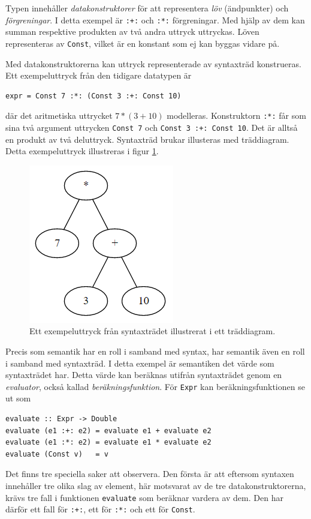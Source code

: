 Typen innehåller \textit{datakonstruktorer} för att representera
\textit{löv} (ändpunkter) och \textit{förgreningar}. I detta exempel är
\texttt{:+:} och \texttt{:*:} förgreningar. Med hjälp av dem kan summan respektive produkten av två andra uttryck uttryckas. Löven
representeras av
\texttt{Const}, vilket är en konstant som ej kan byggas vidare på.

Med datakonstruktorerna kan uttryck representerade av syntaxträd konstrueras. Ett exempeluttryck
från den tidigare datatypen är
\begin{lstlisting}
expr = Const 7 :*: (Const 3 :+: Const 10)
\end{lstlisting}
där det aritmetiska uttrycket $7 * (3
+ 10)$ modelleras. Konstruktorn \texttt{:*:} får som sina två argument uttrycken
\texttt{Const 7} och \texttt{Const 3 :+: Const 10}. Det är alltså en produkt av
två deluttryck. Syntaxträd brukar illusteras med träddiagram. Detta
exempeluttryck illustreras i figur \ref{fig:syntax_exempel_bild}.

\begin{figure}[tph]
  \centering
  \includegraphics[width=0.4\linewidth]{figure/syntax_exempel_bild.png}
  \caption{Ett exempeluttryck från syntaxträdet illustrerat i ett
           träddiagram.}\label{fig:syntax_exempel_bild}
\end{figure}

Precis som semantik har en roll i samband med syntax, har semantik även en roll
i samband med syntaxträd. I detta exempel är semantiken det värde som
syntaxträdet har. Detta värde kan beräknas utifrån syntaxträdet genom
en \textit{evaluator}, också kallad \textit{beräkningsfunktion}. För \texttt{Expr}
kan beräkningsfunktionen se ut som
\begin{lstlisting}
evaluate :: Expr -> Double
evaluate (e1 :+: e2) = evaluate e1 + evaluate e2
evaluate (e1 :*: e2) = evaluate e1 * evaluate e2
evaluate (Const v)   = v
\end{lstlisting}
Det finns tre speciella saker att observera. Den första är att eftersom syntaxen innehåller tre olika
slag av element, här motsvarat av de tre datakonstruktorerna, krävs tre fall i
funktionen \texttt{evaluate} som beräknar vardera av dem. Den har
därför ett fall för \texttt{:+:}, ett för \texttt{:*:} och ett för
\texttt{Const}.

